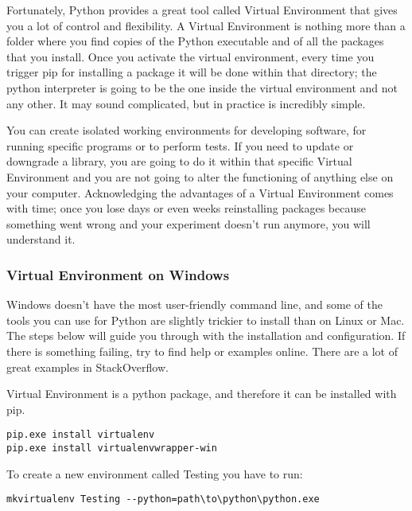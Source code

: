 Fortunately, Python provides a great tool called Virtual Environment that gives you a lot of control and flexibility. A Virtual Environment is nothing more than a folder where you find copies of the Python executable and of all the packages that you install. Once you activate the virtual environment, every time you trigger pip for installing a package it will be done within that directory; the python interpreter is going to be the one inside the virtual environment and not any other. It may sound complicated, but in practice is incredibly simple.

You can create isolated working environments for developing software, for running specific programs or to perform tests. If you need to update or downgrade a library, you are going to do it within that specific Virtual Environment and you are not going to alter the functioning of anything else on your computer. Acknowledging the advantages of a Virtual Environment comes with time; once you lose days or even weeks reinstalling packages because something went wrong and your experiment doesn’t run anymore, you will understand it.


\subsubsection{Virtual Environment on Windows}
Windows doesn’t have the most user-friendly command line, and some of the tools you can use for Python are slightly trickier to install than on Linux or Mac. The steps below will guide you through with the installation and configuration. If there is something failing, try to find help or examples online. There are a lot of great examples in StackOverflow.

Virtual Environment is a python package, and therefore it can be installed with pip.

\begin{verbatim}
pip.exe install virtualenv
pip.exe install virtualenvwrapper-win
\end{verbatim}

To create a new environment called Testing you have to run:

\begin{verbatim}
mkvirtualenv Testing --python=path\to\python\python.exe
\end{verbatim}

